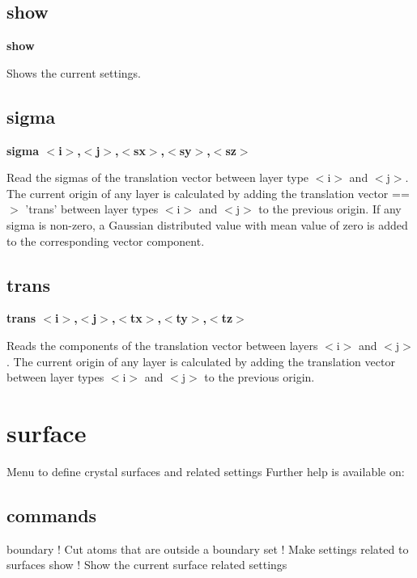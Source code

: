 \subsection*{show}
{\bf show \par }
\par
\vspace{3pt}
Shows the current settings. 
\subsection*{sigma}
{\bf sigma $ <$i$> $,$ <$j$> $,$ <$sx$> $,$ <$sy$> $,$ <$sz$> $ \par }
\par
\vspace{3pt}
Read the sigmas of the translation vector between layer type $ <$i$> $ and $ <$j$> $. 
The current origin of any layer is calculated by adding the translation 
vector ==$> $ 'trans' between layer types $ <$i$> $ and $ <$j$> $ to the previous origin. 
If any sigma is non-zero, a Gaussian distributed value with mean value of 
zero is added to the corresponding vector component. 
\subsection*{trans}
{\bf trans $ <$i$> $,$ <$j$> $,$ <$tx$> $,$ <$ty$> $,$ <$tz$> $ \par }
\par
\vspace{3pt}
Reads the components of the translation vector between layers $ <$i$> $ and $ <$j$> $. 
The current origin of any layer is calculated by adding the translation 
vector between layer types $ <$i$> $ and $ <$j$> $ to the previous origin. 
\section{surface}
\par
Menu to define crystal surfaces and related settings 
Further help is available on: 
\subsection*{commands}
\begin{MacVerbatim}
boundary   ! Cut atoms that are outside a boundary
set        ! Make settings related to surfaces
show       ! Show the current surface related settings
\end{MacVerbatim}
